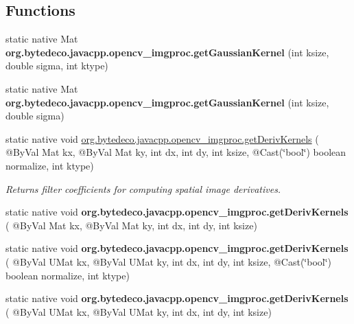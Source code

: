 \subsection*{Functions}
\begin{DoxyCompactItemize}
\item 
\mbox{\label{group__imgproc__filter_ga78d72770238ad9e6346f095e2dd4129a}} 
static native Mat {\bfseries org.\+bytedeco.\+javacpp.\+opencv\+\_\+imgproc.\+get\+Gaussian\+Kernel} (int ksize, double sigma, int ktype)
\item 
\mbox{\label{group__imgproc__filter_gab8bfd31a460b6bdd01e2c5223aff10cf}} 
static native Mat {\bfseries org.\+bytedeco.\+javacpp.\+opencv\+\_\+imgproc.\+get\+Gaussian\+Kernel} (int ksize, double sigma)
\item 
static native void \hyperlink{group__imgproc__filter_ga6e163a3c7af7f53953629e3bc1a4d5ea}{org.\+bytedeco.\+javacpp.\+opencv\+\_\+imgproc.\+get\+Deriv\+Kernels} ( @By\+Val Mat kx, @By\+Val Mat ky, int dx, int dy, int ksize, @Cast(\char`\"{}bool\char`\"{}) boolean normalize, int ktype)
\begin{DoxyCompactList}\small\item\em Returns filter coefficients for computing spatial image derivatives. \end{DoxyCompactList}\item 
\mbox{\label{group__imgproc__filter_gad0867cdcbc4f3b2dfddbebe3d3088abf}} 
static native void {\bfseries org.\+bytedeco.\+javacpp.\+opencv\+\_\+imgproc.\+get\+Deriv\+Kernels} ( @By\+Val Mat kx, @By\+Val Mat ky, int dx, int dy, int ksize)
\item 
\mbox{\label{group__imgproc__filter_ga22960dc8afd97615eef765be7214efbe}} 
static native void {\bfseries org.\+bytedeco.\+javacpp.\+opencv\+\_\+imgproc.\+get\+Deriv\+Kernels} ( @By\+Val U\+Mat kx, @By\+Val U\+Mat ky, int dx, int dy, int ksize, @Cast(\char`\"{}bool\char`\"{}) boolean normalize, int ktype)
\item 
\mbox{\label{group__imgproc__filter_gaf4de92968523f2b4b8f47a500b445766}} 
static native void {\bfseries org.\+bytedeco.\+javacpp.\+opencv\+\_\+imgproc.\+get\+Deriv\+Kernels} ( @By\+Val U\+Mat kx, @By\+Val U\+Mat ky, int dx, int dy, int ksize)

\end{DoxyCompactItemize}

